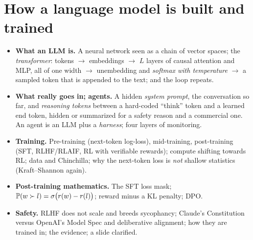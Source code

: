 \chapter{How a language model is built and trained}\label{ch:L6}

\newcommand{\Lpiref}{\pi_{\mathrm{ref}}}
\newcommand{\Lrelu}{\mathrm{ReLU}}
\newcommand{\Lcal}{\mathcal{L}}

\begin{glance}
\begin{itemize}
  \item \textbf{What an LLM is.} A neural network seen as a chain of vector spaces; the \emph{transformer}: tokens $\to$ embeddings $\to$ $L$ layers of causal attention and MLP, all of one width $\to$ unembedding and \emph{softmax with temperature} $\to$ a sampled token that is appended to the text; and the loop repeats.
  \item \textbf{What really goes in; agents.} A hidden \emph{system prompt}, the conversation so far, and \emph{reasoning tokens} between a hard-coded ``think'' token and a learned end token, hidden or summarized for a safety reason and a commercial one. An agent is an LLM plus a \emph{harness}; four layers of monitoring.
  \item \textbf{Training.} Pre-training (next-token log-loss), mid-training, post-training (SFT, RLHF/RLAIF, RL with verifiable rewards); compute shifting towards RL; data and Chinchilla; why the next-token loss is \emph{not} shallow statistics (Kraft--Shannon again).
  \item \textbf{Post-training mathematics.} The SFT loss mask; $\mathbb{P}(w\succ l)=\sigma\big(r(w)-r(l)\big)$; reward minus a KL penalty; DPO.
  \item \textbf{Safety.} RLHF does not scale and breeds sycophancy; Claude's Constitution versus OpenAI's Model Spec and deliberative alignment; how they are trained in; the evidence; a slide clarified.
\end{itemize}
\end{glance}

